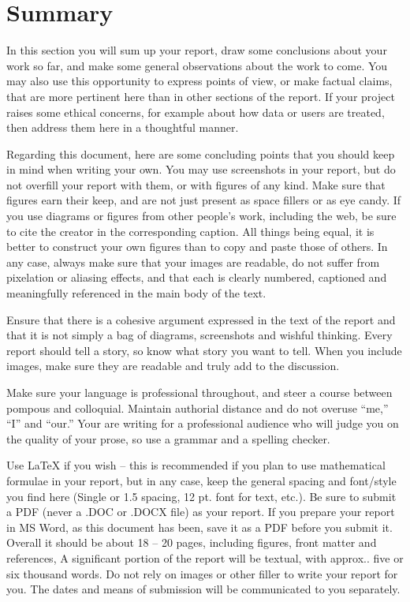 \chapter{Summary}

In this section you will sum up your report, draw some conclusions about your work so far, and make some general observations about the work to come. You may also use this opportunity to express points of view, or make factual claims, that are more pertinent here than in other sections of the report. If your project raises some ethical concerns, for example about how data or users are treated, then address them here in a thoughtful manner.

Regarding this document, here are some concluding points that you should keep in mind when writing your own. You may use screenshots in your report, but do not overfill your report with them, or with figures of any kind. Make sure that figures earn their keep, and are not just present as space fillers or as eye candy. If you use diagrams or figures from other people’s work, including the web, be sure to cite the creator in the corresponding caption. All things being equal, it is better to construct your own figures than to copy and paste those of others. In any case, always make sure that your images are readable, do not suffer from pixelation or aliasing effects, and that each is clearly numbered, captioned and meaningfully referenced in the main body of the text.

Ensure that there is a cohesive argument expressed in the text of the report and that it is not simply a bag of diagrams, screenshots and wishful thinking. Every report should tell a story, so know what story you want to tell. When you include images, make sure they are readable and truly add to the discussion.

Make sure your language is professional throughout, and steer a course between pompous and colloquial. Maintain authorial distance and do not overuse “me,” “I” and “our.” Your are writing for a professional audience who will judge you on the quality of your prose, so use a grammar and a spelling checker.

Use LaTeX if you wish – this is recommended if you plan to use mathematical formulae in your report, but in any case, keep the general spacing and font/style you find here (Single or 1.5 spacing, 12 pt. font for text, etc.). Be sure to submit a PDF (never a .DOC or .DOCX file) as your report. If you prepare your report in MS Word, as this document has been, save it as a PDF before you submit it. Overall it should be about 18 – 20 pages, including figures, front matter and references, A significant portion of the report will be textual, with approx.. five or six thousand words. Do not rely on images or other filler to write your report for you.
The dates and means of submission will be communicated to you separately.
